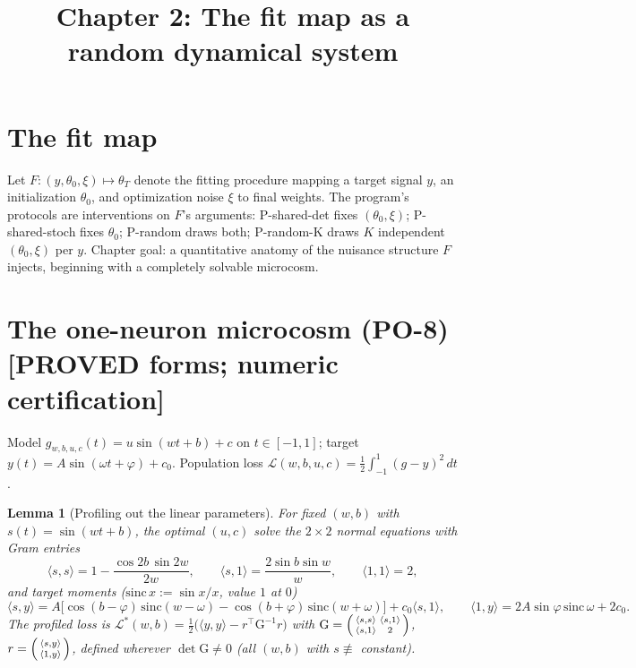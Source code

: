 \documentclass[11pt]{article}
\title{Chapter 2: The fit map as a random dynamical system}
\newtheorem{lemma}[theorem]{Lemma}
\begin{document}
\maketitle

\section{The fit map}
Let $F:(y,\theta_0,\xi)\mapsto\theta_T$ denote the fitting procedure mapping a target signal $y$,
an initialization $\theta_0$, and optimization noise $\xi$ to final weights. The program's
protocols are interventions on $F$'s arguments: P-shared-det fixes $(\theta_0,\xi)$;
P-shared-stoch fixes $\theta_0$; P-random draws both; P-random-K draws $K$ independent
$(\theta_0,\xi)$ per $y$. Chapter goal: a quantitative anatomy of the nuisance structure
$F$ injects, beginning with a completely solvable microcosm.

\section{The one-neuron microcosm (PO-8) [PROVED forms; numeric certification]}

Model $g_{w,b,u,c}(t)=u\sin(wt+b)+c$ on $t\in[-1,1]$; target $y(t)=A\sin(\omega t+\varphi)+c_0$.
Population loss $\mathcal L(w,b,u,c)=\tfrac12\int_{-1}^{1}(g-y)^2\,dt$.

\begin{lemma}[Profiling out the linear parameters]\label{lem:profile}
For fixed $(w,b)$ with $s(t)=\sin(wt+b)$, the optimal $(u,c)$ solve the $2\times2$ normal
equations with Gram entries
\[
\langle s,s\rangle = 1-\frac{\cos 2b\,\sin 2w}{2w},\qquad
\langle s,1\rangle = \frac{2\sin b\sin w}{w},\qquad
\langle 1,1\rangle = 2,
\]
and target moments ($\mathrm{sinc}\,x:=\sin x/x$, value $1$ at $0$)
\[
\langle s,y\rangle = A\big[\cos(b-\varphi)\,\mathrm{sinc}(w-\omega)-\cos(b+\varphi)\,
\mathrm{sinc}(w+\omega)\big] + c_0\langle s,1\rangle,\qquad
\langle 1,y\rangle = 2A\sin\varphi\,\mathrm{sinc}\,\omega + 2c_0 .
\]
The profiled loss is
$\mathcal L^*(w,b)=\tfrac12\big(\langle y,y\rangle - r^\top \mathrm G^{-1} r\big)$ with
$\mathrm G=\begin{psmallmatrix}\langle s,s\rangle&\langle s,1\rangle\\ \langle s,1\rangle&2
\end{psmallmatrix}$, $r=\begin{psmallmatrix}\langle s,y\rangle\\ \langle 1,y\rangle
\end{psmallmatrix}$, defined wherever $\det \mathrm G\neq0$ (all $(w,b)$ with $s\not\equiv$
constant).
\end{lemma}
\end{document}
